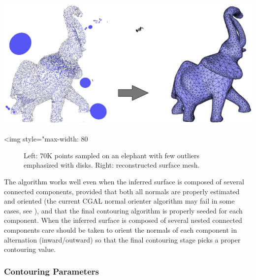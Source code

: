 \begin{center}
    \begin{ccTexOnly}
        \includegraphics[width=1.0\textwidth]{Surface_reconstruction_points_3/outliers} %
    \end{ccTexOnly}
    \begin{ccHtmlOnly}
        <img style="max-width: 80%
    \end{ccHtmlOnly}
    \begin{figure}[h]
        \caption{Left: 70K points sampled on an elephant with few
                 outliers emphasized with disks.
                 Right: reconstructed surface mesh.}
        \label{Surface_reconstruction_points_3-fig-outliers}
    \end{figure}
\end{center}


The algorithm works well even when the inferred surface is composed of several connected components, provided that both all normals are properly estimated and oriented (the current CGAL normal orienter algorithm may fail in some cases, see ), and that the final contouring algorithm is properly seeded for each component. When the inferred surface is composed of several nested connected components care should be taken to orient the normals of each component in alternation (inward/outward) so that the final contouring stage picks a proper contouring value.


\subsubsection{Contouring Parameters}

